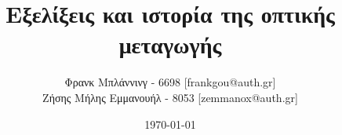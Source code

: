 \documentclass[11pt]{article}
\title{Εξελίξεις και ιστορία της οπτικής μεταγωγής}
\author{Φρανκ Μπλάννινγ - 6698 [frankgou@auth.gr] \\ Ζήσης Μήλης Εμμανουήλ - 8053
  [zemmanox@auth.gr]}
\date{\today}
\begin{document}
\maketitle











{}
% 
\end{document}

